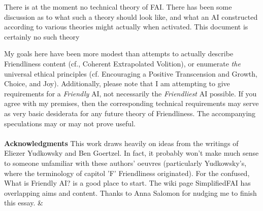 \documentclass[twoside,11pt]{article}
\begin{document}
There is at the moment no technical theory of FAI. There has been some
discussion as to what such a theory should look like, and what an AI 
constructed according to various theories might actually when activated. This
document is certainly no such theory

My goals here have been more modest than attempts to actually describe
Friendliness content (cf., Coherent Extrapolated Volition), or enumerate
\emph{the} universal ethical principles (cf.  Encouraging a Positive
Transcension and Growth, Choice, and Joy). Additionally, please note that I am
attempting to give requirements for a \emph{Friendly} AI, not necessarily the
\emph{Friendliest} AI possible. If you agree with my premises, then the
corresponding technical
requirements may serve as very basic desiderata for any future theory of
 Friendliness. The accompanying speculations may or may not prove useful.\\
\\

\textbf{Acknowledgments}
 This work draws heavily on ideas from the writings of Eliezer Yudkowsky and Ben Goertzel. In fact, it probably won't make much sense to someone unfamiliar with these authors' oeuvres (particularly Yudkowsky's, where the terminology of capitol 'F' Friendliness originated). For the confused,  What is Friendly AI? is a good place to start. The wiki page SimplifiedFAI has overlapping aims and content. Thanks to Anna Salomon for nudging me to finish this essay.   &





\end{document}
